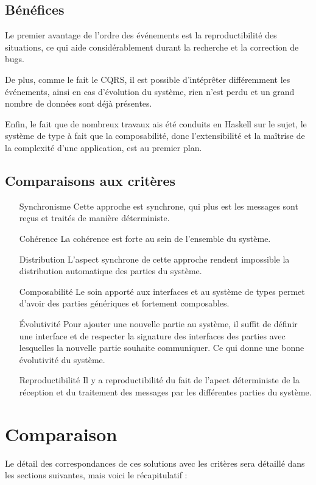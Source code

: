 \documentclass{article}
\begin{document}
\subsection{Bénéfices}\label{bénéfices-1}

Le premier avantage de l'ordre des événements est la reproductibilité
des situations, ce qui aide considérablement durant la recherche et la
correction de bugs.

De plus, comme le fait le CQRS, il est possible d'intéprêter différemment
les événements, ainsi en cas d'évolution du système, rien n'est perdu et
un grand nombre de données sont déjà présentes.

Enfin, le fait que de nombreux travaux ais été conduits en Haskell sur
le sujet, le système de type à fait que la composabilité, donc
l'extensibilité et la maîtrise de la complexité d'une application, est
au premier plan.

\subsection{Comparaisons aux critères}
\begin{itemize}
    \item[Synchronisme] Cette approche est synchrone, qui plus est les messages
sont reçus et traités de manière déterministe.
    \item[Cohérence] La cohérence est forte au sein de l'ensemble du système.
    \item[Distribution] L'aspect synchrone de cette approche rendent impossible la distribution  
automatique des parties du système.
    \item[Composabilité] Le soin apporté aux interfaces et au système de types
permet d'avoir des parties génériques et fortement composables.
    \item[Évolutivité] Pour ajouter une nouvelle partie au système, il suffit de
définir une interface et de respecter la signature des interfaces des parties
avec lesquelles la nouvelle partie souhaite communiquer. Ce qui donne une bonne
évolutivité du système.
    \item[Reproductibilité] Il y a reproductibilité du fait de l'apect déterministe
de la réception et du traitement des messages par les différentes parties du système.
\end{itemize}

\section{Comparaison}
Le détail des correspondances de ces solutions avec les critères sera détaillé
dans les sections suivantes, mais voici le récapitulatif :
\end{document}
